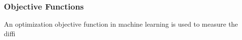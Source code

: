 \subsubsection{Objective Functions}
An optimization objective function in machine learning is used to measure the diffi
